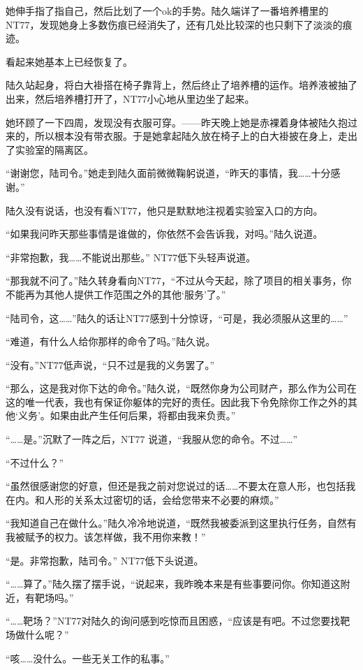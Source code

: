 她伸手指了指自己，然后比划了一个ok的手势。陆久端详了一番培养槽里的NT77，发现她身上多数伤痕已经消失了，还有几处比较深的也只剩下了淡淡的痕迹。

看起来她基本上已经恢复了。

陆久站起身，将白大褂搭在椅子靠背上，然后终止了培养槽的运作。培养液被抽了出来，然后培养槽打开了，NT77小心地从里边坐了起来。

她环顾了一下四周，发现没有衣服可穿。——昨天晚上她是赤裸着身体被陆久抱过来的，所以根本没有带衣服。于是她拿起陆久放在椅子上的白大褂披在身上，走出了实验室的隔离区。

“谢谢您，陆司令。”她走到陆久面前微微鞠躬说道，“昨天的事情，我……十分感谢。”

陆久没有说话，也没有看NT77，他只是默默地注视着实验室入口的方向。

“如果我问昨天那些事情是谁做的，你依然不会告诉我，对吗。”陆久说道。

“非常抱歉，我……不能说出那些。” NT77低下头轻声说道。

“那我就不问了。”陆久转身看向NT77，“不过从今天起，除了项目的相关事务，你不能再为其他人提供工作范围之外的其他‘服务’了。”

“陆司令，这……”陆久的话让NT77感到十分惊讶，“可是，我必须服从这里的……”

“难道，有什么人给你那样的命令了吗。”陆久说。

“没有。”NT77低声说，“只不过是我的义务罢了。”

“那么，这是我对你下达的命令。”陆久说，“既然你身为公司财产，那么作为公司在这的唯一代表，我也有保证你躯体的完好的责任。因此我下令免除你工作之外的其他‘义务’。如果由此产生任何后果，将都由我来负责。”

“……是。”沉默了一阵之后，NT77 说道，“我服从您的命令。不过……”

“不过什么？”

“虽然很感谢您的好意，但还是我之前对您说过的话……不要太在意人形，也包括我在内。和人形的关系太过密切的话，会给您带来不必要的麻烦。”

“我知道自己在做什么。”陆久冷冷地说道，“既然我被委派到这里执行任务，自然有我被赋予的权力。该怎样做，我不用你来教！”

“是。非常抱歉，陆司令。” NT77低下头说道。

“……算了。”陆久摆了摆手说，“说起来，我昨晚本来是有些事要问你。你知道这附近，有靶场吗。”

“……靶场？”NT77对陆久的询问感到吃惊而且困惑，“应该是有吧。不过您要找靶场做什么呢？”

“咳……没什么。一些无关工作的私事。”

